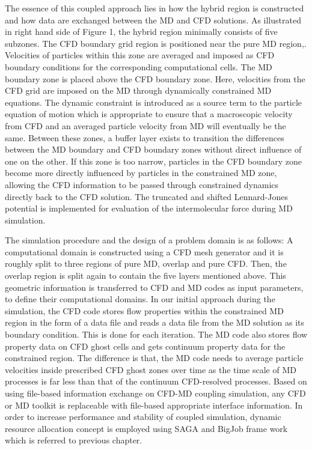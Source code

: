 \documentclass[times, 10pt,twocolumn]{article}
\begin{document}
The essence of this coupled approach lies in how the hybrid region is constructed and how data are exchanged between the MD and CFD solutions. As illustrated in right hand side of Figure 1, the hybrid region minimally consists of five subzones. The CFD boundary grid region is positioned near the pure MD region,. Velocities of particles within this zone are averaged and imposed as CFD boundary conditions for the corresponding computational cells. The MD boundary zone is placed above the CFD boundary zone. Here, velocities from the CFD grid are imposed on the MD through dynamically constrained MD equations. The dynamic constraint is introduced as a source term to the particle equation of motion which is appropriate to ensure that a macroscopic velocity from CFD and an averaged particle velocity from MD will eventually be the same. Between these zones, a buffer layer exists to transition the differences between the MD boundary and CFD boundary zones without direct influence of one on the other. If this zone is too narrow, particles in the CFD boundary zone become more directly influenced by particles in the constrained MD zone, allowing the CFD information to be passed through constrained dynamics directly back to the CFD solution. The truncated and shifted Lennard-Jones potential is implemented for evaluation of the intermolecular force during MD simulation.

The simulation procedure and the design of a problem domain is as follows: A computational domain is constructed using a CFD mesh generator and it is roughly split to three regions of pure MD, overlap and pure CFD. Then, the overlap region is split again to contain the five layers mentioned above. This geometric information is transferred to CFD and MD codes as input parameters, to define their computational domains. In our initial approach during the simulation, the CFD code stores flow properties within the constrained MD region in the form of a data file and reads a data file from the MD solution as its boundary condition. This is done for each iteration. The MD code also stores flow property data on CFD ghost cells and gets continuum property data for the constrained region. The difference is that, the MD code needs to average particle velocities inside prescribed CFD ghost zones over time as the time scale of MD processes is far less than that of the continuum CFD-resolved processes. Based on using file-based information exchange on CFD-MD coupling simulation, any CFD or MD toolkit is replaceable with file-based appropriate interface information.
In order to increase performance and stability of coupled simulation, dynamic resource allocation concept is employed  using SAGA and BigJob frame work which is referred to previous chapter. 
\end{document}
